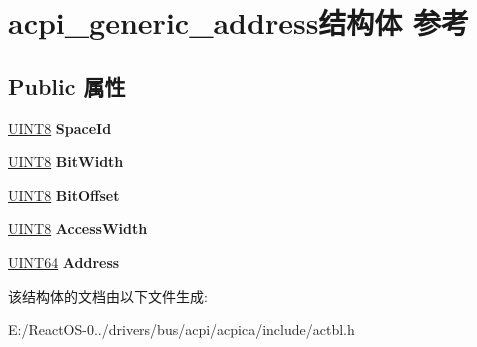 \hypertarget{structacpi__generic__address}{}\section{acpi\+\_\+generic\+\_\+address结构体 参考}
\label{structacpi__generic__address}
\subsection*{Public 属性}
\begin{DoxyCompactItemize}
\item 
\mbox{\label{structacpi__generic__address_a621b6ea2242200a389c3460f334c6030}} 
\hyperlink{_processor_bind_8h_ab27e9918b538ce9d8ca692479b375b6a}{U\+I\+N\+T8} {\bfseries Space\+Id}
\item 
\mbox{\label{structacpi__generic__address_addf1e8ab2f52338fd4481f887b1acbbf}} 
\hyperlink{_processor_bind_8h_ab27e9918b538ce9d8ca692479b375b6a}{U\+I\+N\+T8} {\bfseries Bit\+Width}
\item 
\mbox{\label{structacpi__generic__address_aef4783018e8f5d9e9286aafb41ff8a38}} 
\hyperlink{_processor_bind_8h_ab27e9918b538ce9d8ca692479b375b6a}{U\+I\+N\+T8} {\bfseries Bit\+Offset}
\item 
\mbox{\label{structacpi__generic__address_af07c78ba71745f4af5c3166aff697bb9}} 
\hyperlink{_processor_bind_8h_ab27e9918b538ce9d8ca692479b375b6a}{U\+I\+N\+T8} {\bfseries Access\+Width}
\item 
\mbox{\label{structacpi__generic__address_af74fe335aa9812494002894f8399853a}} 
\hyperlink{_processor_bind_8h_a57be03562867144161c1bfee95ca8f7c}{U\+I\+N\+T64} {\bfseries Address}
\end{DoxyCompactItemize}


该结构体的文档由以下文件生成\+:\begin{DoxyCompactItemize}
\item 
E\+:/\+React\+O\+S-\/0../drivers/bus/acpi/acpica/include/actbl.\+h\end{DoxyCompactItemize}
